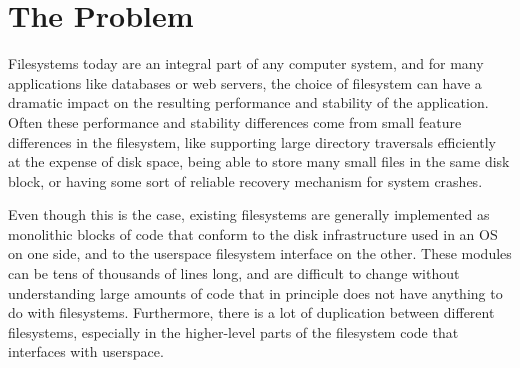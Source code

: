 \section{The Problem}
\label{sec:problem}

Filesystems today are an integral part of any computer system, and for many
applications like databases or web servers, the choice of filesystem can have a
dramatic impact on the resulting performance and stability of the application.
Often these performance and stability differences come from small feature
differences in the filesystem, like supporting large directory traversals
efficiently at the expense of disk space, being able to store many small files
in the same disk block, or having some sort of reliable recovery mechanism for
system crashes.

Even though this is the case, existing filesystems are generally implemented as
monolithic blocks of code that conform to the disk infrastructure used in an OS
on one side, and to the userspace filesystem interface on the other. These
modules can be tens of thousands of lines long, and are difficult to change
without understanding large amounts of code that in principle does not have
anything to do with filesystems. Furthermore, there is a lot of duplication
between different filesystems, especially in the higher-level parts of the
filesystem code that interfaces with userspace.
